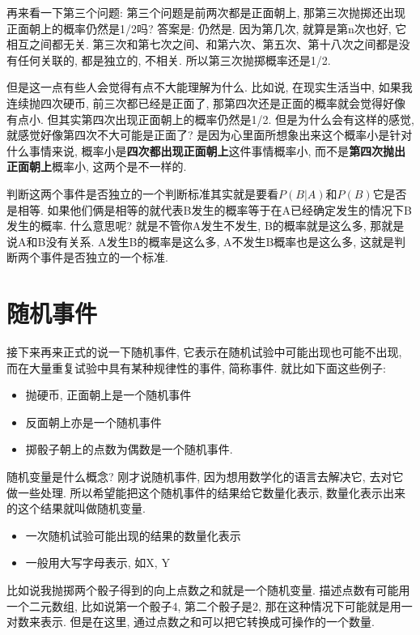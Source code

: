 再来看一下第三个问题: 第三个问题是前两次都是正面朝上, 那第三次抛掷还出现正面朝上的概率仍然是1/2吗? 答案是: 仍然是. 因为第几次, 就算是第n次也好, 它相互之间都无关. 第三次和第七次之间、和第六次、第五次、第十八次之间都是没有任何关联的, 都是独立的, 不相关. 所以第三次抛掷概率还是1/2. 

但是这一点有些人会觉得有点不大能理解为什么. 比如说, 在现实生活当中, 如果我连续抛四次硬币, 前三次都已经是正面了, 那第四次还是正面的概率就会觉得好像有点小. 但其实第四次出现正面朝上的概率仍然是1/2. 但是为什么会有这样的感觉, 就感觉好像第四次不大可能是正面了? 是因为心里面所想象出来这个概率小是针对什么事情来说, 概率小是\textbf{四次都出现正面朝上}这件事情概率小, 而不是\textbf{第四次抛出正面朝上}概率小, 这两个是不一样的. 

判断这两个事件是否独立的一个判断标准其实就是要看$P(B|A)$和$P(B)$它是否是相等. 如果他们俩是相等的就代表B发生的概率等于在A已经确定发生的情况下B发生的概率. 什么意思呢? 就是不管你A发生不发生, B的概率就是这么多, 那就是说A和B没有关系. A发生B的概率是这么多, A不发生B概率也是这么多, 这就是判断两个事件是否独立的一个标准. 

\section{随机事件}

接下来再来正式的说一下随机事件, 它表示在随机试验中可能出现也可能不出现, 而在大量重复试验中具有某种规律性的事件, 简称事件. 就比如下面这些例子:

\begin{itemize}
  \item 抛硬币, 正面朝上是一个随机事件
  \item 反面朝上亦是一个随机事件
  \item 掷骰子朝上的点数为偶数是一个随机事件. 
\end{itemize}

随机变量是什么概念? 刚才说随机事件, 因为想用数学化的语言去解决它, 去对它做一些处理. 所以希望能把这个随机事件的结果给它数量化表示, 数量化表示出来的这个结果就叫做随机变量. 

\begin{itemize}
  \item 一次随机试验可能出现的结果的数量化表示
  \item 一般用大写字母表示,  如X, Y
\end{itemize}

比如说我抛掷两个骰子得到的向上点数之和就是一个随机变量. 描述点数有可能用一个二元数组, 比如说第一个骰子4, 第二个骰子是2, 那在这种情况下可能就是用一对数来表示. 但是在这里, 通过点数之和可以把它转换成可操作的一个数量. 

